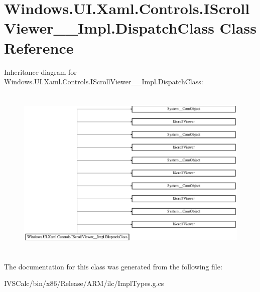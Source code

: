 \hypertarget{class_windows_1_1_u_i_1_1_xaml_1_1_controls_1_1_i_scroll_viewer_____impl_1_1_dispatch_class}{}\section{Windows.\+U\+I.\+Xaml.\+Controls.\+I\+Scroll\+Viewer\+\_\+\+\_\+\+Impl.\+Dispatch\+Class Class Reference}
\label{class_windows_1_1_u_i_1_1_xaml_1_1_controls_1_1_i_scroll_viewer_____impl_1_1_dispatch_class}
Inheritance diagram for Windows.\+U\+I.\+Xaml.\+Controls.\+I\+Scroll\+Viewer\+\_\+\+\_\+\+Impl.\+Dispatch\+Class\+:\begin{figure}[H]
\begin{center}
\leavevmode
\includegraphics[height=8.369565cm]{class_windows_1_1_u_i_1_1_xaml_1_1_controls_1_1_i_scroll_viewer_____impl_1_1_dispatch_class}
\end{center}
\end{figure}


The documentation for this class was generated from the following file\+:\begin{DoxyCompactItemize}
\item 
I\+V\+S\+Calc/bin/x86/\+Release/\+A\+R\+M/ilc/Impl\+Types.\+g.\+cs\end{DoxyCompactItemize}
